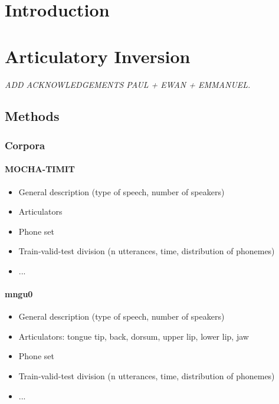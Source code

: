 

\section{Introduction}







\section{Articulatory Inversion}
\small{\textit{{\color{red}ADD ACKNOWLEDGEMENTS PAUL + EWAN + EMMANUEL.\\}}}

\subsection{Methods}
\subsubsection{Corpora}
\paragraph{MOCHA-TIMIT}
\begin{itemize}
\item General description (type of speech, number of speakers)
\item Articulators
\item Phone set
\item Train-valid-test division (n utterances, time, distribution of phonemes)
\item ...
\end{itemize}

\paragraph{mngu0}
\begin{itemize}
\item General description (type of speech, number of speakers)
\item Articulators: tongue {tip, back, dorsum}, upper lip, lower lip, jaw
\item Phone set
\item Train-valid-test division (n utterances, time, distribution of phonemes)
\item ...
\end{itemize}

